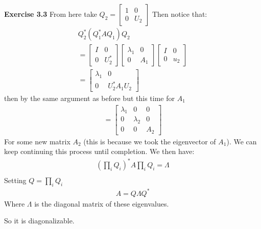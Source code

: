 \documentclass[12pt]{article}
\newenvironment{exercise}[1]{\vspace{.1in}\noindent\textbf{Exercise #1 \hspace{.05em}}}{}
\theoremstyle{definition}
\theoremstyle{remark}
\begin{document}
\begin{exercise}{3.3}
	From here take $Q_2=%
		\begin{bmatrix}
			1 & 0   \\
			0 & U_2
		\end{bmatrix}$
	Then notice that:
	\begin{align}
		Q_2^*(Q_1^*AQ_1)Q_2 \\
		= %
		\begin{bmatrix}
			I & 0     \\
			0 & U_2^*
		\end{bmatrix} %
		\begin{bmatrix}
			\lambda_1 & 0   \\
			0         & A_1
		\end{bmatrix} %
		\begin{bmatrix}
			I & 0   \\
			0 & u_2
		\end{bmatrix}      \\
		= %
		\begin{bmatrix}
			\lambda_1 & 0           \\
			0         & U_2^*A_1U_2
		\end{bmatrix}
	\end{align}
	then by the same argument as before but this time for $A_1$
	\begin{align}
		= %
		\begin{bmatrix}
			\lambda_1 & 0         & 0   \\
			0         & \lambda_2 & 0   \\
			0         & 0         & A_2
		\end{bmatrix}
	\end{align}
	For some new matrix $A_2$ (this is because we took the eigenvector of $A_1$). We can keep continuing this process until completion. We then have:
	\begin{align}
		(\prod_i Q_i)^*A\prod_iQ_i=\Lambda \\
	\end{align}
	Setting $Q=\prod_i Q_i$
	\begin{align}
		A=Q\Lambda Q^*
	\end{align}
	Where $\Lambda$ is the diagonal matrix of these eigenvalues.

	So it is diagonalizable.
\end{exercise}
\end{document}
